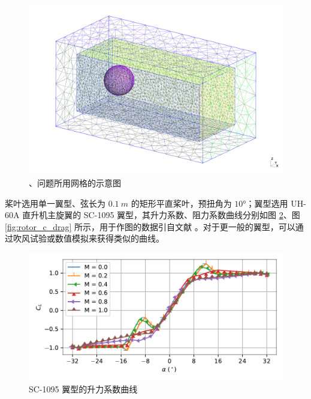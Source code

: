 \begin{figure}[h!]
\begin{centering}
\includegraphics[width=1\textwidth,height=0.33\textheight,keepaspectratio]{../mdpi/figures/rotor_in_tunnel/mesh}
\par\end{centering}
\caption{\label{fig:rotor_mesh}、问题所用网格的示意图}
\end{figure}

桨叶选用单一翼型、弦长为 $\SI{0.1}{m}$ 的矩形平直桨叶，预扭角为 $\ang{10}$；翼型选用 UH-60A 直升机主旋翼的
SC-1095 翼型，其升力系数、阻力系数曲线分别如图 \ref{fig:rotor_c_lift}、图 \ref{fig:rotor_c_drag}
所示，用于作图的数据引自文献 \cite{Howlett_1981}。对于更一般的翼型，可以通过吹风试验或数值模拟来获得类似的曲线。

\begin{figure}[h!]
\begin{centering}
\includegraphics[width=1\textwidth,height=0.26\textheight,keepaspectratio]{figures/airfoil/lift}
\par\end{centering}
\caption{\label{fig:rotor_c_lift}SC-1095 翼型的升力系数曲线}
\end{figure}

